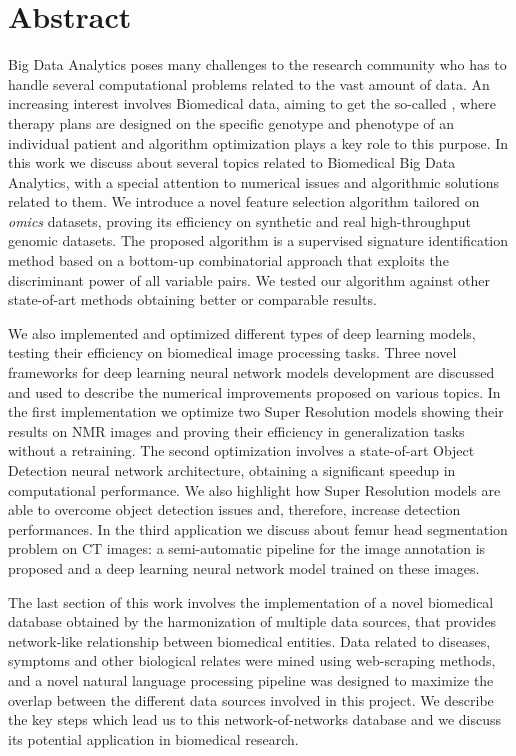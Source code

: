 \documentclass{standalone}
\begin{document}
\chapter*{Abstract}

Big Data Analytics poses many challenges to the research community who has to handle several computational problems related to the vast amount of data.
An increasing interest involves Biomedical data, aiming to get the so-called , where therapy plans are designed on the specific genotype and phenotype of an individual patient and algorithm optimization plays a key role to this purpose.
In this work we discuss about several topics related to Biomedical Big Data Analytics, with a special attention to numerical issues and algorithmic solutions related to them.
We introduce a novel feature selection algorithm tailored on \emph{omics} datasets, proving its efficiency on synthetic and real high-throughput genomic datasets.
The proposed algorithm is a supervised signature identification method based on a bottom-up combinatorial approach that exploits the discriminant power of all variable pairs.
We tested our algorithm against other state-of-art methods obtaining better or comparable results.

We also implemented and optimized different types of deep learning models, testing their efficiency on biomedical image processing tasks.
Three novel frameworks for deep learning neural network models development are discussed and used to describe the numerical improvements proposed on various topics.
In the first implementation we optimize two Super Resolution models showing their results on NMR images and proving their efficiency in generalization tasks without a retraining.
The second optimization involves a state-of-art Object Detection neural network architecture, obtaining a significant speedup in computational performance.
We also highlight how Super Resolution models are able to overcome object detection issues and, therefore, increase detection performances.
In the third application we discuss about femur head segmentation problem on CT images: a semi-automatic pipeline for the image annotation is proposed and a deep learning neural network model trained on these images.

The last section of this work involves the implementation of a novel biomedical database obtained by the harmonization of multiple data sources, that provides network-like relationship between biomedical entities.
Data related to diseases, symptoms and other biological relates were mined using web-scraping methods, and a novel natural language processing pipeline was designed to maximize the overlap between the different data sources involved in this project.
We describe the key steps which lead us to this network-of-networks database and we discuss its potential application in biomedical research.
\end{document}
